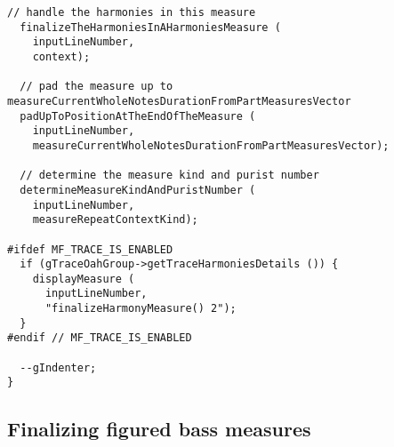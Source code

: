 \begin{lstlisting}[language=CPlusPlus]
  // handle the harmonies in this measure
  finalizeTheHarmoniesInAHarmoniesMeasure (
    inputLineNumber,
    context);

  // pad the measure up to measureCurrentWholeNotesDurationFromPartMeasuresVector
  padUpToPositionAtTheEndOfTheMeasure (
    inputLineNumber,
    measureCurrentWholeNotesDurationFromPartMeasuresVector);

  // determine the measure kind and purist number
  determineMeasureKindAndPuristNumber (
    inputLineNumber,
    measureRepeatContextKind);

#ifdef MF_TRACE_IS_ENABLED
  if (gTraceOahGroup->getTraceHarmoniesDetails ()) {
    displayMeasure (
      inputLineNumber,
      "finalizeHarmonyMeasure() 2");
  }
#endif // MF_TRACE_IS_ENABLED

  --gIndenter;
}
\end{lstlisting}


\subsection{Finalizing figured bass measures}


